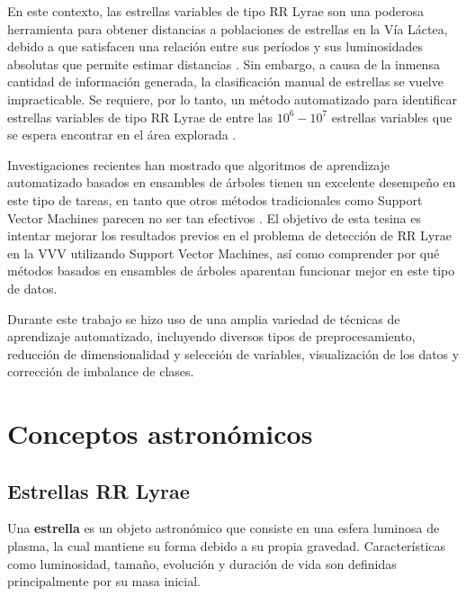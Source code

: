 \par En este contexto, las estrellas variables de tipo RR Lyrae son una poderosa herramienta para obtener distancias a poblaciones de estrellas en la Vía Láctea, debido a que satisfacen una relación entre sus períodos y sus luminosidades absolutas que permite estimar distancias \cite{Shapley} \cite{Baade}. Sin embargo, a causa de la inmensa cantidad de información generada, la clasificación manual de estrellas se vuelve impracticable. Se requiere, por lo tanto, un método automatizado para identificar estrellas variables de tipo RR Lyrae de entre las $10^6-10^7$ estrellas variables que se espera encontrar en el área explorada \cite{jbc}. \\

\par Investigaciones recientes han mostrado que algoritmos de aprendizaje automatizado basados en ensambles de árboles tienen un excelente desempeño en este tipo de tareas, en tanto que otros métodos tradicionales como Support Vector Machines parecen no ser tan efectivos \cite{elorrieta} \cite{jbc}. El objetivo de esta tesina es intentar mejorar los resultados previos en el problema de detección de RR Lyrae en la VVV utilizando Support Vector Machines, así como comprender por qué métodos basados en ensambles de árboles aparentan funcionar mejor en este tipo de datos.  \\

\par Durante este trabajo se hizo uso de una amplia variedad de técnicas de aprendizaje automatizado, incluyendo diversos tipos de preprocesamiento, reducción de dimensionalidad y selección de variables, visualización de los datos y corrección de imbalance de clases. 

\section {Conceptos astronómicos}

\subsection{Estrellas RR Lyrae}

\par Una \textbf{estrella} es un objeto astronómico que consiste en una esfera luminosa de plasma, la cual mantiene su forma debido a su propia gravedad. Características como luminosidad, tamaño, evolución y duración de vida son definidas principalmente por su masa inicial. \\

